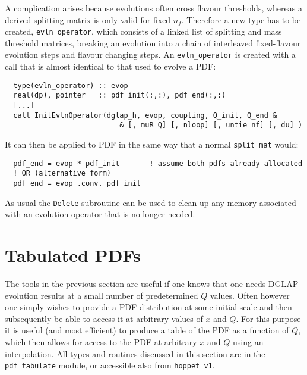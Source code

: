 \documentclass[12pt]{article}
\newcommand{\ttt}[1]{\texttt{#1}}
\begin{document}
A complication arises because evolutions often cross flavour
thresholds, whereas a derived splitting matrix is only valid for fixed
$n_f$. Therefore a new type has to be created, \ttt{evln\_operator},
which consists of a linked list of splitting and mass threshold
matrices, breaking an evolution into a chain of interleaved
fixed-flavour evolution steps and flavour changing steps. An
\ttt{evln\_operator} is created with a call that is almost identical
to that used to evolve a PDF:
\begin{lstlisting}
  type(evln_operator) :: evop
  real(dp), pointer   :: pdf_init(:,:), pdf_end(:,:)
  [...]
  call InitEvlnOperator(dglap_h, evop, coupling, Q_init, Q_end &
                           & [, muR_Q] [, nloop] [, untie_nf] [, du] )
\end{lstlisting}
It can then be applied to PDF in the same way that a normal
\ttt{split\_mat} would:
\begin{lstlisting}
  pdf_end = evop * pdf_init       ! assume both pdfs already allocated
  ! OR (alternative form) 
  pdf_end = evop .conv. pdf_init  
\end{lstlisting}
As usual the \ttt{Delete} subroutine can be used to clean up any
memory associated with an evolution operator that is no longer needed.


\section{Tabulated PDFs}
\label{sec:tabulated-pdfs}

The tools in the previous section are useful if one knows that one
needs DGLAP evolution results at a small number of predetermined $Q$
values. Often however one simply wishes to provide a PDF distribution
at some initial scale and then subsequently be able to access it at
arbitrary values of $x$ and $Q$. For this purpose it is useful 
(and most efficient) to
produce a table of the PDF as a function of $Q$, which then allows
for access to the PDF at arbitrary $x$ and $Q$ using an interpolation. All
types and routines discussed in this section are in the
\ttt{pdf\_tabulate} module, or accessible also from \ttt{hoppet\_v1}.
\end{document}
